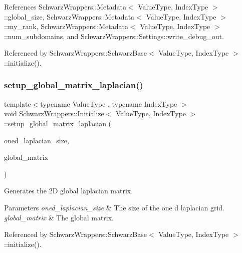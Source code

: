 References Schwarz\+Wrappers\+::\+Metadata$<$ Value\+Type, Index\+Type $>$\+::global\+\_\+size, Schwarz\+Wrappers\+::\+Metadata$<$ Value\+Type, Index\+Type $>$\+::my\+\_\+rank, Schwarz\+Wrappers\+::\+Metadata$<$ Value\+Type, Index\+Type $>$\+::num\+\_\+subdomains, and Schwarz\+Wrappers\+::\+Settings\+::write\+\_\+debug\+\_\+out.



Referenced by Schwarz\+Wrappers\+::\+Schwarz\+Base$<$ Value\+Type, Index\+Type $>$\+::initialize().

\mbox{\label{classSchwarzWrappers_1_1Initialize_abb6b1f844e9f334b2baf07f114506a77}} 
\subsubsection{\texorpdfstring{setup\+\_\+global\+\_\+matrix\+\_\+laplacian()}{setup\_global\_matrix\_laplacian()}}
{\footnotesize\ttfamily template$<$typename Value\+Type , typename Index\+Type $>$ \\
void \hyperlink{classSchwarzWrappers_1_1Initialize}{Schwarz\+Wrappers\+::\+Initialize}$<$ Value\+Type, Index\+Type $>$\+::setup\+\_\+global\+\_\+matrix\+\_\+laplacian (\begin{DoxyParamCaption}\item[{const gko\+::size\+\_\+type \&}]{oned\+\_\+laplacian\+\_\+size,  }\item[{std\+::shared\+\_\+ptr$<$ gko\+::matrix\+::\+Csr$<$ Value\+Type, Index\+Type $>$$>$ \&}]{global\+\_\+matrix }\end{DoxyParamCaption})}



Generates the 2D global laplacian matrix. 


\begin{DoxyParams}{Parameters}
{\em oned\+\_\+laplacian\+\_\+size} & The size of the one d laplacian grid. \\
\hline
{\em global\+\_\+matrix} & The global matrix. \\
\hline
\end{DoxyParams}


Referenced by Schwarz\+Wrappers\+::\+Schwarz\+Base$<$ Value\+Type, Index\+Type $>$\+::initialize().

